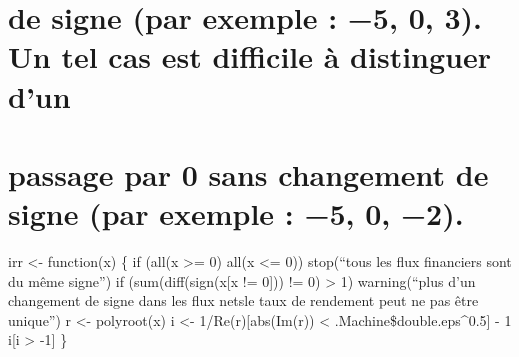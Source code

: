 \documentclass[]{article}
\begin{document}
\hypertarget{de-signe-par-exemple-5-0-3.-un-tel-cas-est-difficile-uxe0-distinguer-dun}{%
\section{de signe (par exemple : −5, 0, 3). Un tel cas est difficile à
distinguer
d'un}\label{de-signe-par-exemple-5-0-3.-un-tel-cas-est-difficile-uxe0-distinguer-dun}}

\hypertarget{passage-par-0-sans-changement-de-signe-par-exemple-5-0-2.}{%
\section{passage par 0 sans changement de signe (par exemple : −5, 0,
−2).}\label{passage-par-0-sans-changement-de-signe-par-exemple-5-0-2.}}

irr \textless{}- function(x) \{ if (all(x \textgreater{}= 0)
\textbar{}\textbar{} all(x \textless{}= 0)) stop(``tous les flux
financiers sont du même signe'') if (sum(diff(sign(x{[}x != 0{]})) != 0)
\textgreater{} 1) warning(``plus d'un changement de signe dans les flux
nets\n le taux de rendement peut ne pas être unique'') r \textless{}-
polyroot(x) i \textless{}- 1/Re(r){[}abs(Im(r)) \textless{}
.Machine\$double.eps\^{}0.5{]} - 1 i{[}i \textgreater{} -1{]} \}
\end{document}
